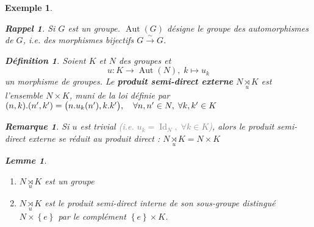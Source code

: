 \documentclass[a4paper, oneside]{report}
\theoremstyle{break}
\newtheorem{lemme}[thm]{Lemme}
\newtheorem{definition}[thm]{Définition}
\newtheorem*{rappel}{Rappel}
\newtheorem{exemple}[thm]{Exemple}
\newtheorem{remarque}[thm]{Remarque}
\newcommand{\gray}[1]{\textcolor{gray}{#1}}
\DeclarePairedDelimiter\ens{\left\{ }{\right\} }%
\DeclarePairedDelimiter\pa{\big(}{\big)}%
\DeclareMathOperator{\Aut}{Aut}
\DeclareMathOperator{\Id}{Id}
\renewcommand{\ens}[1]{\left\{ #1 \right\} }%
\newcommand{\slign}{\textbf}
\newcommand{\us}{\underset}
\newcommand{\os}{\overset}
\begin{document}
\begin{exemple}
\begin{rappel}
Si $G$ est un groupe. $\Aut(G)$ désigne le groupe des automorphismes de $G$, i.e. des morphismes bijectifs $G \os{\sim}{\rightarrow} G$.
\end{rappel}



\begin{definition}
Soient $K$ et $N$ des groupes et 
\[
u : K \rightarrow \Aut(N), \; k \mapsto u_k
\]
un morphisme de groupes. Le \slign{produit semi-direct externe} $N \us{u}{\rtimes} K$ est l'ensemble $N \times K$, muni de la loi définie par $(n, k) . (n', k') = \pa{n . u_k(n'), k.k'},	\quad	\forall n, n' \in N, \; \forall k, k' \in K$
\end{definition}

\begin{remarque}
Si $u$ est trivial \gray{(i.e. $u_k = \Id_N, \; \forall k \in K$)}, alors le produit semi-direct externe se réduit au produit direct : $N \us{u}{\rtimes} K = N \times K$
\end{remarque}

\begin{lemme}
\begin{enumerate}
\item  $N \us{u}{\rtimes} K$ est un groupe

\medbreak

\item  $N \us{u}{\rtimes} K$ est le produit semi-direct interne de son sous-groupe distingué $N \times \ens{e}$ par le complément $\ens{e} \times K$.

\end{enumerate}
\end{lemme}


\end{exemple}
\end{document}
